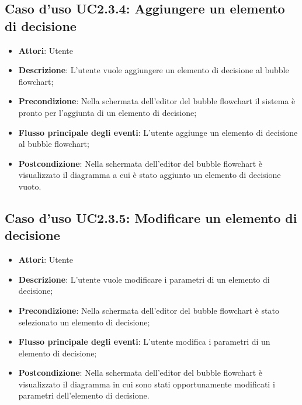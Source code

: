 \documentclass[../AnalisiDeiRequisiti.tex]{subfiles}
\begin{document}
					\subsection{Caso d'uso UC2.3.4: Aggiungere un elemento di decisione}
					\begin{itemize}
						\item \textbf{Attori}: Utente
						\item \textbf{Descrizione}: L'utente vuole aggiungere un elemento di decisione al bubble flowchart;
						\item \textbf{Precondizione}: Nella schermata dell'editor del bubble flowchart il sistema è pronto per l'aggiunta di un elemento di decisione;
						\item \textbf{Flusso principale degli eventi}: L'utente aggiunge un elemento di decisione al bubble flowchart;
						\item \textbf{Postcondizione}: Nella schermata dell'editor del bubble flowchart è visualizzato il diagramma a cui è stato aggiunto un elemento di decisione vuoto.
					\end{itemize}
					\subsection{Caso d'uso UC2.3.5: Modificare un elemento di decisione}
					\begin{itemize}
						\item \textbf{Attori}: Utente
						\item \textbf{Descrizione}: L'utente vuole modificare i parametri di un elemento di decisione;
						\item \textbf{Precondizione}: Nella schermata dell'editor del bubble flowchart è stato selezionato un elemento di decisione;
						\item \textbf{Flusso principale degli eventi}: L'utente modifica i parametri di un elemento di decisione;
						\item \textbf{Postcondizione}: Nella schermata dell'editor del bubble flowchart è visualizzato il diagramma in cui sono stati opportunamente modificati i parametri dell'elemento di decisione.
					\end{itemize}
\end{document}
